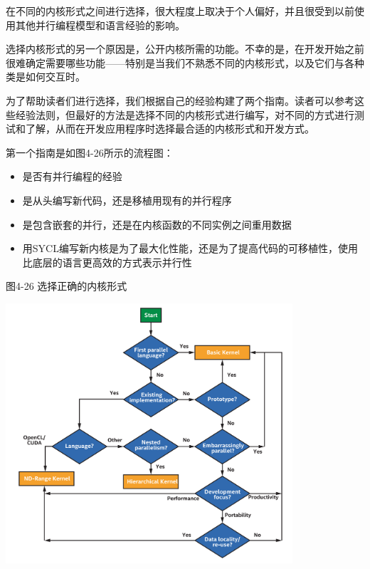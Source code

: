 在不同的内核形式之间进行选择，很大程度上取决于个人偏好，并且很受到以前使用其他并行编程模型和语言经验的影响。\par

选择内核形式的另一个原因是，公开内核所需的功能。不幸的是，在开发开始之前很难确定需要哪些功能——特别是当我们不熟悉不同的内核形式，以及它们与各种类是如何交互时。\par

为了帮助读者们进行选择，我们根据自己的经验构建了两个指南。读者可以参考这些经验法则，但最好的方法是选择不同的内核形式进行编写，对不同的方式进行测试和了解，从而在开发应用程序时选择最合适的内核形式和开发方式。\par

第一个指南是如图4-26所示的流程图：\par

\begin{itemize}
	\item 是否有并行编程的经验
	\item 是从头编写新代码，还是移植用现有的并行程序
	\item 是包含嵌套的并行，还是在内核函数的不同实例之间重用数据
	\item 用SYCL编写新内核是为了最大化性能，还是为了提高代码的可移植性，使用比底层的语言更高效的方式表示并行性
\end{itemize}

\hspace*{\fill} \par %
图4-26 选择正确的内核形式
\begin{center}
	\includegraphics[width=0.8\textwidth]{content/chapter-4/images/7}
\end{center}

